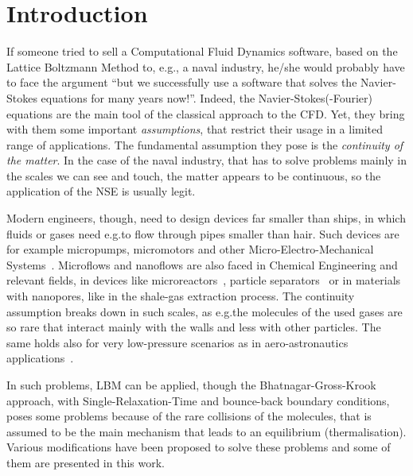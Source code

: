 \section{Introduction}
If someone tried to sell a Computational Fluid Dynamics software, based on
the Lattice Boltzmann Method to, e.g.\@, a naval industry, he/she 
would probably have to face the argument ``but we successfully use a
software that solves the Navier-Stokes equations for many years now!''.
Indeed, the Navier-Stokes(-Fourier) equations are the main tool of the classical approach
to the CFD. Yet, they bring with them some important \textit{assumptions}, that restrict
their usage in a limited range of applications. The fundamental assumption they
pose is the \textit{continuity of the matter}. In the case of the naval industry,
that has to solve problems mainly in the scales we can see and touch, the matter
appears to be continuous, so the application of the NSE is usually legit. 

Modern engineers, though, need to design devices far smaller than ships, in which
fluids or gases need e.g.\@ to flow through pipes smaller than hair. Such devices
are for example micropumps, micromotors and other Micro-Electro-Mechanical 
Systems~\cite{Karniadakis_Microflows}. Microflows and nanoflows are also faced 
in Chemical Engineering and relevant fields, in devices like microreactors~\cite{Neumann2012},
particle separators~\cite{Karniadakis_Microflows} or in materials with nanopores, 
like in the shale-gas extraction process. 
The continuity assumption breaks down in
such scales, as e.g.\@ the molecules of the used gases are so rare that interact
mainly with the walls and less with other particles. The same holds also for
very low-pressure scenarios as in aero-astronautics applications~\cite{Toschi2005}.

In such problems, LBM can be applied, though the Bhatnagar-Gross-Krook approach, with Single-Relaxation-Time
and bounce-back boundary conditions,
poses some problems because of the rare collisions of the molecules, that is
assumed to be the main mechanism that leads to an equilibrium (thermalisation). Various
modifications have been proposed to solve these problems and some of them are 
presented in this work.